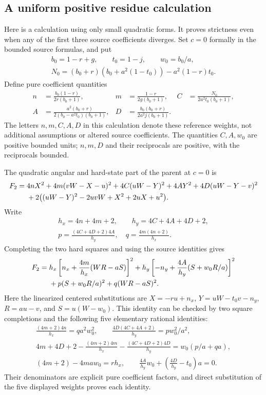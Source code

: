 \subsection{A uniform positive residue calculation}
Here is a calculation using only small quadratic forms.  It proves
strictness even when any of the first three source coefficients diverges.
Set $c=0$ formally in the bounded source formulas, and put
\[
\begin{gathered}
b_0=1-r+g,\qquad t_0=1-j,\qquad w_0=b_0/a,\\
N_0=(b_0+r)(b_0+a^2(1-t_0))-a^2(1-r)t_0.
\end{gathered}
\]
Define pure coefficient quantities
\begin{align*}
n&=\frac{b_0(1-r)}{2r(b_0+1)},&
m&=\frac{1-r}{2g(b_0+1)},&
C&=\frac{N_0}{2a^2t_0(b_0+1)},\\
A&=\frac{a^2(b_0+r)}{2(b_0-a^2t_0)(b_0+1)},&
D&=\frac{b_0(b_0+r)}{2a^2j(b_0+1)}.
\end{align*}
The letters $n,m,C,A,D$ in this calculation denote these reference
weights, not additional assumptions or altered source coefficients.
The quantities $C,A,w_0$ are positive bounded units; $n,m,D$ and their
reciprocals are positive, with the reciprocals bounded.

The quadratic angular and hard-state part of the parent at $c=0$ is
\begin{align}
F_2={}&4nX^2+4m(vW-X-u)^2+4C(uW-Y)^2
 +4AY^2+4D(uW-Y-v)^2\notag\\
&+2\bigl((uW-Y)^2-2uvW+X^2+2uX+u^2\bigr).
\label{eq:c2u-F2}
\end{align}
Write
\[
\begin{gathered}
h_x=4n+4m+2,\qquad h_y=4C+4A+4D+2,\\
p=\frac{(4C+4D+2)4A}{h_y},\quad
q=\frac{4m(4n+2)}{h_x}.
\end{gathered}
\]
Completing the two hard squares and using the source identities gives
\begin{align}
F_2={}&h_x\left[n_x+\frac{4m}{h_x}(WR-aS)\right]^2
 +h_y\left[-n_y+\frac{4A}{h_y}(S+w_0R/a)\right]^2\notag\\
&+p(S+w_0R/a)^2+q(WR-aS)^2.
\label{eq:c2u-F2-factor}
\end{align}
Here the linearized centered substitutions are
$X=-ru+n_x$, $Y=uW-t_0v-n_y$,
$R=au-v$, and $S=u(W-w_0)$.  This identity can be checked by two
square completions and the following five elementary rational identities:
\begin{gather*}
\frac{(4m+2)4n}{h_x}=qa^2w_0^2,\qquad
\frac{4D(4C+4A+2)}{h_y}=p w_0^2/a^2,\\
4m+4D+2-\frac{(4m+2)4m}{h_x}
 -\frac{(4C+4D+2)4D}{h_y}
 =w_0(p/a+qa),\\
(4m+2)-4maw_0=rh_x,\qquad
\frac{4A}{h_y}w_0+\left(\frac{4D}{h_y}-t_0\right)a=0.
\end{gather*}
Their denominators are explicit pure coefficient factors, and direct
substitution of the five displayed weights proves each identity.

